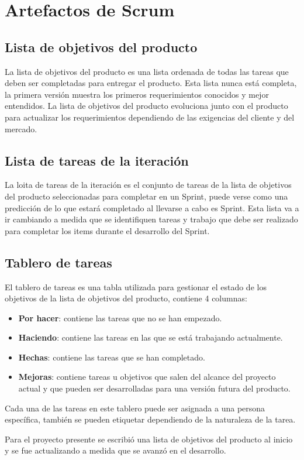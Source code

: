 \section{Artefactos de Scrum}
\subsection{Lista de objetivos del producto}
La lista de objetivos del producto es una lista ordenada de todas las tareas que deben ser completadas para entregar el producto. Esta lista nunca está completa, la primera versión muestra los primeros requerimientos conocidos y mejor entendidos. \cite{scrumSchwaber} La lista de objetivos del producto evoluciona junto con el producto para actualizar los requerimientos dependiendo de las exigencias del cliente y del mercado.

\subsection{Lista de tareas de la iteración}
La loita de tareas de la iteración es el conjunto de tareas de la lista de objetivos del producto seleccionadas para completar en un Sprint, puede verse como una predicción de lo que estará completado al llevarse a cabo es Sprint. \cite{scrumSchwaber} Esta lista va a ir cambiando a medida que se identifiquen tareas y trabajo que debe ser realizado para completar los items durante el desarrollo del Sprint.

\subsection{Tablero de tareas}
El tablero de tareas es una tabla utilizada para gestionar el estado de los objetivos de la lista de objetivos del producto, contiene 4 columnas:

\begin{itemize}
    \item \textbf{Por hacer}: contiene las tareas que no se han empezado.
    \item \textbf{Haciendo}: contiene las tareas en las que se está trabajando actualmente.
    \item \textbf{Hechas}: contiene las tareas que se han completado.
    \item \textbf{Mejoras}: contiene tareas u objetivos que salen del alcance del proyecto actual y que pueden ser desarrolladas para una versión futura del producto.
\end{itemize}

Cada una de las tareas en este tablero puede ser asignada a una persona específica, también se pueden etiquetar dependiendo de la naturaleza de la tarea.

Para el proyecto presente se escribió una lista de objetivos del producto al inicio y se fue actualizando a medida que se avanzó en el desarrollo. 



